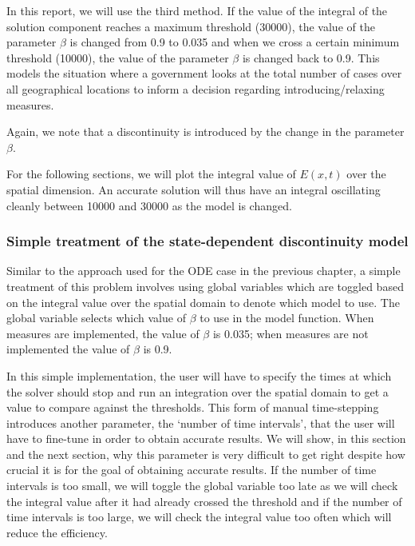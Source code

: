 \documentclass{article}
\begin{document}
In this report, we will use the third method. If the value of the integral of the solution component reaches a maximum threshold (30000), the value of the parameter $\beta$ is changed from 0.9 to 0.035 and when we cross a certain minimum threshold (10000), the value of the parameter $\beta$ is changed back to 0.9. This models the situation where a government looks at the total number of cases over all geographical locations to inform a decision regarding introducing/relaxing measures.

Again, we note that a discontinuity is introduced by the change in the parameter $\beta$.

For the following sections, we will plot the integral value of $E(x, t)$ over the spatial dimension. An accurate solution will thus have an integral oscillating cleanly between 10000 and 30000 as the model is changed.

\subsubsection{Simple treatment of the state-dependent discontinuity model}
\label{subsubsection:pde_state_naive}
Similar to the approach used for the ODE case in the previous chapter, a simple treatment of this problem involves using global variables which are toggled based on the integral value over the spatial domain to denote which model to use. The global variable selects which value of $\beta$ to use in the model function. When measures are implemented, the value of $\beta$ is 0.035; when measures are not implemented the value of $\beta$ is 0.9.

In this simple implementation, the user will have to specify the times at which the solver should stop and run an integration over the spatial domain to get a value to compare against the thresholds. This form of manual time-stepping introduces another parameter, the `number of time intervals', that the user will have to fine-tune in order to obtain accurate results. We will show, in this section and the next section, why this parameter is very difficult to get right despite how crucial it is for the goal of obtaining accurate results. If the number of time intervals is too small, we will toggle the global variable too late as we will check the integral value after it had already crossed the threshold and if the number of time intervals is too large, we will check the integral value too often which will reduce the efficiency. 
\end{document}
